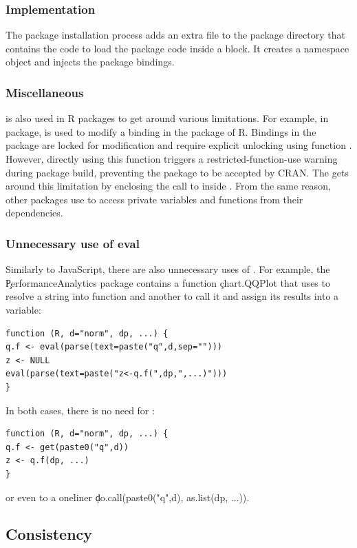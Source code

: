 \documentclass[conference]{IEEEtran}
\begin{document}
  \subsubsection{Implementation}
  The package installation process adds an extra file to the package directory
  that contains the code to load the package code inside a \local block. It
  creates a namespace object and injects the package bindings.

  \subsubsection{Miscellaneous} \eval is also used in R packages to get around
  various limitations. For example, in \datatable package, \eval is used to
  modify a binding in the \base package of R. Bindings in the \base package are
  locked for modification and require explicit unlocking using 
  function \unlockBinding. However, directly using this function triggers a
  restricted-function-use warning during package build, preventing the package
  to be accepted by CRAN. The \datatable gets around this limitation by
  enclosing the call to \unlockBinding inside \eval. From the same reason, other
  packages use \eval to access private variables and functions from their
  dependencies.

  \subsubsection{Unnecessary use of eval}
  Similarly to JavaScript, there are also unnecessary uses of \eval.
  For example, the \c{PerformanceAnalytics} package contains a function
  \c{chart.QQPlot} that uses \eval to resolve a string into function and
  another to call it and assign its results into a variable:
  \begin{lstlisting}
function (R, d="norm", dp, ...) {
q.f <- eval(parse(text=paste("q",d,sep="")))
z <- NULL
eval(parse(text=paste("z<-q.f(",dp,",...)")))
}
  \end{lstlisting}
  In both cases, there is no need for \eval:
  \begin{lstlisting}
function (R, d="norm", dp, ...) {
q.f <- get(paste0("q",d))
z <- q.f(dp, ...)
}
  \end{lstlisting}
  or even to a oneliner \c{do.call(paste0("q",d), as.list(dp, ...))}.

\subsection{Consistency}
\end{document}
